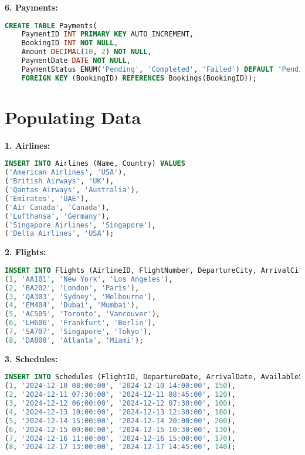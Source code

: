\documentclass[14pt,a4paper]{extarticle}
\begin{document}
\textbf{6. Payments:}
\begin{lstlisting}[language=SQL, upquote=true]
CREATE TABLE Payments(
    PaymentID INT PRIMARY KEY AUTO_INCREMENT,
    BookingID INT NOT NULL,
    Amount DECIMAL(10, 2) NOT NULL,
    PaymentDate DATE NOT NULL,
    PaymentStatus ENUM('Pending', 'Completed', 'Failed') DEFAULT 'Pending',
    FOREIGN KEY (BookingID) REFERENCES Bookings(BookingID));
\end{lstlisting}

\newpage

\section{Populating Data}

\textbf{1. Airlines:}
\begin{lstlisting}[language=SQL, upquote=true]
INSERT INTO Airlines (Name, Country) VALUES
('American Airlines', 'USA'),
('British Airways', 'UK'),
('Qantas Airways', 'Australia'),
('Emirates', 'UAE'),
('Air Canada', 'Canada'),
('Lufthansa', 'Germany'),
('Singapore Airlines', 'Singapore'),
('Delta Airlines', 'USA');
\end{lstlisting}

\textbf{2. Flights:}
\begin{lstlisting}[language=SQL, upquote=true]
INSERT INTO Flights (AirlineID, FlightNumber, DepartureCity, ArrivalCity) VALUES
(1, 'AA101', 'New York', 'Los Angeles'),
(2, 'BA202', 'London', 'Paris'),
(3, 'QA303', 'Sydney', 'Melbourne'),
(4, 'EM404', 'Dubai', 'Mumbai'),
(5, 'AC505', 'Toronto', 'Vancouver'),
(6, 'LH606', 'Frankfurt', 'Berlin'),
(7, 'SA707', 'Singapore', 'Tokyo'),
(8, 'DA808', 'Atlanta', 'Miami');
\end{lstlisting}

\textbf{3. Schedules:}
\begin{lstlisting}[language=SQL, upquote=true]
INSERT INTO Schedules (FlightID, DepartureDate, ArrivalDate, AvailableSeats) VALUES
(1, '2024-12-10 08:00:00', '2024-12-10 14:00:00', 150),
(2, '2024-12-11 07:30:00', '2024-12-11 08:45:00', 120),
(3, '2024-12-12 06:00:00', '2024-12-12 07:30:00', 100),
(4, '2024-12-13 10:00:00', '2024-12-13 12:30:00', 180),
(5, '2024-12-14 15:00:00', '2024-12-14 20:00:00', 200),
(6, '2024-12-15 09:00:00', '2024-12-15 10:30:00', 130),
(7, '2024-12-16 11:00:00', '2024-12-16 15:00:00', 170),
(8, '2024-12-17 13:00:00', '2024-12-17 14:45:00', 140);
\end{lstlisting}

\newpage
\end{document}
